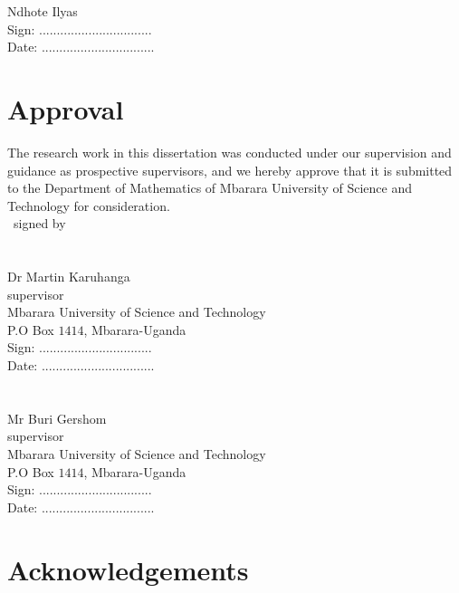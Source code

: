 		\vspace{0.25in}

		Ndhote Ilyas\\
		Sign: ................................\\
		Date: ................................
	\newpage
	\section*{Approval}
		The research work in this dissertation was conducted under our supervision and guidance as prospective supervisors, and we hereby approve that it is submitted to the Department of Mathematics of Mbarara University of Science and Technology for consideration.\\\
		signed by\\\\
		\vspace{0.25in}\\

		Dr Martin Karuhanga\\
		supervisor\\
		Mbarara  University of Science and Technology\\
		P.O Box $1414$,	Mbarara-Uganda\\
		Sign: ................................\\
		Date: ................................\\\\
		\vspace{0.25in}\\

		Mr Buri Gershom\\
		supervisor\\
		Mbarara University of Science and Technology\\
		P.O Box $1414$,	Mbarara-Uganda\\
		Sign: ................................\\
		Date: ................................
		\vspace{0.25in}


	\newpage
	\section*{Acknowledgements}

